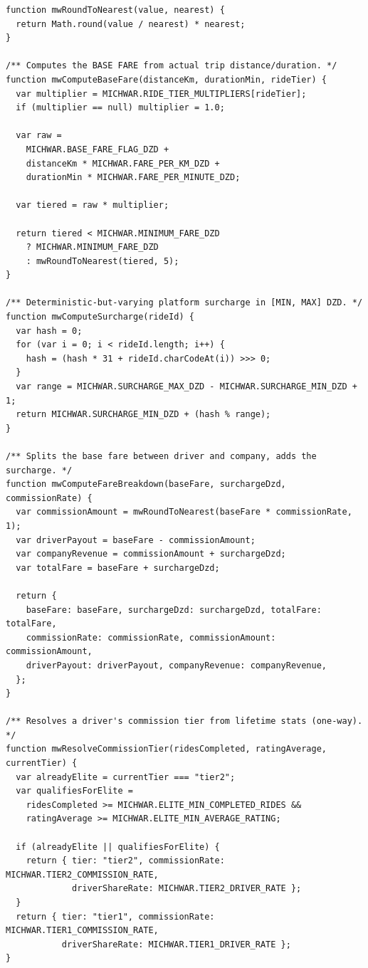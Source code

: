 \documentclass[11pt,a4paper]{article}
\begin{document}
\begin{lstlisting}[language=JSPB,caption={\texttt{pb\_hooks/02\_pricing.pb.js} --- the sole source of billed fare, commission, and loyalty numbers (abridged).},label={lst:pricing}]
function mwRoundToNearest(value, nearest) {
  return Math.round(value / nearest) * nearest;
}

/** Computes the BASE FARE from actual trip distance/duration. */
function mwComputeBaseFare(distanceKm, durationMin, rideTier) {
  var multiplier = MICHWAR.RIDE_TIER_MULTIPLIERS[rideTier];
  if (multiplier == null) multiplier = 1.0;

  var raw =
    MICHWAR.BASE_FARE_FLAG_DZD +
    distanceKm * MICHWAR.FARE_PER_KM_DZD +
    durationMin * MICHWAR.FARE_PER_MINUTE_DZD;

  var tiered = raw * multiplier;

  return tiered < MICHWAR.MINIMUM_FARE_DZD
    ? MICHWAR.MINIMUM_FARE_DZD
    : mwRoundToNearest(tiered, 5);
}

/** Deterministic-but-varying platform surcharge in [MIN, MAX] DZD. */
function mwComputeSurcharge(rideId) {
  var hash = 0;
  for (var i = 0; i < rideId.length; i++) {
    hash = (hash * 31 + rideId.charCodeAt(i)) >>> 0;
  }
  var range = MICHWAR.SURCHARGE_MAX_DZD - MICHWAR.SURCHARGE_MIN_DZD + 1;
  return MICHWAR.SURCHARGE_MIN_DZD + (hash % range);
}

/** Splits the base fare between driver and company, adds the surcharge. */
function mwComputeFareBreakdown(baseFare, surchargeDzd, commissionRate) {
  var commissionAmount = mwRoundToNearest(baseFare * commissionRate, 1);
  var driverPayout = baseFare - commissionAmount;
  var companyRevenue = commissionAmount + surchargeDzd;
  var totalFare = baseFare + surchargeDzd;

  return {
    baseFare: baseFare, surchargeDzd: surchargeDzd, totalFare: totalFare,
    commissionRate: commissionRate, commissionAmount: commissionAmount,
    driverPayout: driverPayout, companyRevenue: companyRevenue,
  };
}

/** Resolves a driver's commission tier from lifetime stats (one-way). */
function mwResolveCommissionTier(ridesCompleted, ratingAverage, currentTier) {
  var alreadyElite = currentTier === "tier2";
  var qualifiesForElite =
    ridesCompleted >= MICHWAR.ELITE_MIN_COMPLETED_RIDES &&
    ratingAverage >= MICHWAR.ELITE_MIN_AVERAGE_RATING;

  if (alreadyElite || qualifiesForElite) {
    return { tier: "tier2", commissionRate: MICHWAR.TIER2_COMMISSION_RATE,
             driverShareRate: MICHWAR.TIER2_DRIVER_RATE };
  }
  return { tier: "tier1", commissionRate: MICHWAR.TIER1_COMMISSION_RATE,
           driverShareRate: MICHWAR.TIER1_DRIVER_RATE };
}
\end{lstlisting}
\end{document}
